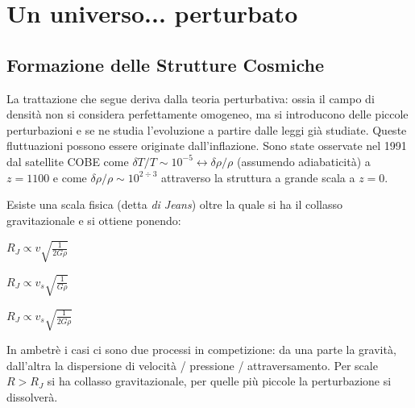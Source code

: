 \chapter{Un universo... perturbato}\label{6:ch}

\section{Formazione delle Strutture Cosmiche}
La trattazione che segue deriva dalla teoria perturbativa: ossia il campo di densità non si considera perfettamente omogeneo, ma si introducono delle piccole perturbazioni e se ne studia l'evoluzione a partire dalle leggi già studiate. Queste fluttuazioni possono essere originate dall'inflazione. Sono state osservate nel 1991 dal satellite COBE come $\delta T / T \sim 10^{-5}\leftrightarrow \delta \rho / \rho$ (assumendo adiabaticità) a $z=1100$ e come $\delta \rho /\rho \sim 10^{2\div 3}$ attraverso la struttura a grande scala a $z=0$.

Esiste una scala fisica (detta \textit{di Jeans}) oltre la quale si ha il collasso gravitazionale e si ottiene ponendo:

\begin{example}[$\mathbf{E_{kin}=E_{pot}}$]
    $R_J \propto v \sqrt{\frac{1}{2 G \rho}} $
\end{example}
\begin{example}[$\mathbf{\bar{F}_{press}=\bar{g}}$]
    $R_J \propto v_s \sqrt{\frac{1}{G \rho}} $
\end{example}
\begin{example}[$\mathbf{\tau_{free\, fall}=\tau_{sound\, crossing}}$]
        $R_J \propto v_s \sqrt{\frac{1}{2 G \rho}} $
\end{example}
In ambetrè i casi ci sono due processi in competizione: da una parte la gravità, dall'altra la dispersione di velocità / pressione / attraversamento. 
Per scale $R>R_J$ si ha collasso gravitazionale, per quelle più piccole la perturbazione si dissolverà.


